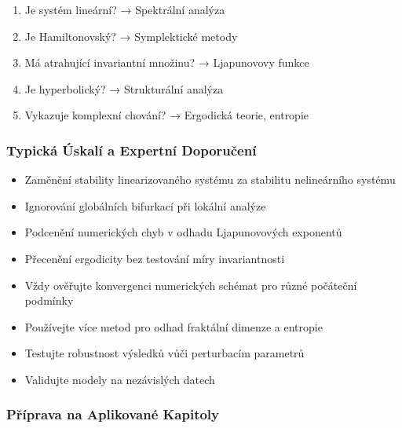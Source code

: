 \begin{application}
\begin{enumerate}
\item Je systém lineární? → Spektrální analýza
\item Je Hamiltonovský? → Symplektické metody
\item Má atrahující invariantní množinu? → Ljapunovovy funkce
\item Je hyperbolický? → Strukturální analýza
\item Vykazuje komplexní chování? → Ergodická teorie, entropie
\end{enumerate}
\end{application}

\subsubsection{Typická Úskalí a Expertní Doporučení}

\begin{warning}
\begin{itemize}
\item Zaměnění stability linearizovaného systému za stabilitu nelineárního systému
\item Ignorování globálních bifurkací při lokální analýze
\item Podcenění numerických chyb v odhadu Ljapunovových exponentů
\item Přecenění ergodicity bez testování míry invariantnosti
\end{itemize}
\end{warning}

\begin{expertnote}
\begin{itemize}
\item Vždy ověřujte konvergenci numerických schémat pro různé počáteční podmínky
\item Používejte více metod pro odhad fraktální dimenze a entropie
\item Testujte robustnost výsledků vůči perturbacím parametrů
\item Validujte modely na nezávislých datech
\end{itemize}
\end{expertnote}

\subsubsection{Příprava na Aplikované Kapitoly}

